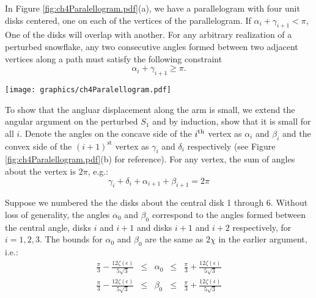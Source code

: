 In Figure \ref{fig:ch4Paralellogram.pdf}(a), we have a parallelogram with four unit disks centered, one on each of the vertices of the parallelogram.  
If $\alpha_i + \gamma_{i+1} < \pi$, One of the disks will overlap with another.  
For any arbitrary realization of a perturbed snowflake, any two consecutive angles formed between two adjacent vertices along a path must satisfy the following constraint $$\alpha_i + \gamma_{i+1} \geq \pi.$$

\begin{minipage}{\linewidth}
\begin{center}
\texttt{[image: graphics/ch4Paralellogram.pdf]}
\label{fig:Vertebrae.pdf}\label{fig:ch4Paralellogram.pdf}
\end{center}
\end{minipage}

To show that the angluar displacement along the arm is small, we extend the angular argument on the perturbed $S_1$ and by induction, show that it is small for all $i$.  
Denote the angles on the concave side of the $i^\text{th}$ vertex as $\alpha_i$ and $\beta_i$ and the convex side of the $(i+1)^\text{st}$ vertex as $\gamma_i$ and $\delta_i$ respectively (see Figure \ref{fig:ch4Paralellogram.pdf}(b) for reference). 
For any vertex, the sum of angles about the vertex is $2 \pi$, e.g.:
$$\gamma_i + \delta_i + \alpha_{i+1} + \beta_{i+1} = 2 \pi$$ 

Suppose we numbered the the disks about the central disk 1 through 6.  
Without loss of generality, the angles $\alpha_0$ and $\beta_0$ correspond to the angles formed between the central angle, disks $i$ and $i+1$ and disks $i+1$ and $i+2$ respectively, for $i = 1,2,3$.  
The bounds for $\alpha_0$ and $\beta_0$ are the same as $2\chi$ in the earlier argument, i.e.:
$$
\begin{array}{rcccl}
\frac{\pi}{3} - \frac{12 \zeta(\epsilon)}{5\sqrt{3}} &\leq& \alpha_0 &\leq& \frac{\pi}{3} + \frac{12 \zeta(\epsilon)}{5\sqrt{3}}\\
\frac{\pi}{3} - \frac{12 \zeta(\epsilon)}{5\sqrt{3}} &\leq& \beta_0 &\leq& \frac{\pi}{3} + \frac{12 \zeta(\epsilon)}{5\sqrt{3}}\\
\end{array}
$$

